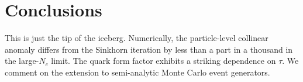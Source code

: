 \section{Conclusions}\label{sec:conclusions}

This is just the tip of the iceberg. Numerically, the particle-level
collinear anomaly differs from the Sinkhorn iteration by less than a
part in a thousand in the large-$N_c$ limit. The quark form factor
exhibits a striking dependence on $\tau$. We comment on the extension to
semi-analytic Monte Carlo event generators.


